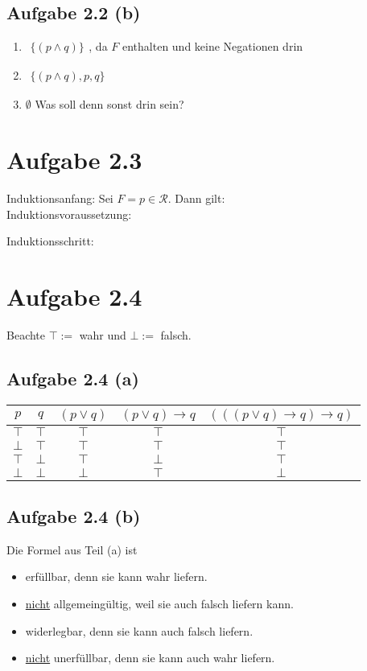 \documentclass[12pt,a4paper]{article}
\begin{document}
\subsection*{Aufgabe 2.2 (b)}
\begin{enumerate}[label=(\arabic*)]
\item $\begin{aligned}\big\lbrace
(p\wedge q)
\big\rbrace\end{aligned}$, da $F$ enthalten und keine Negationen drin
\item $\begin{aligned}\big\lbrace
(p\wedge q), p, q
\big\rbrace\end{aligned}$
\item $\emptyset$ Was soll denn sonst drin sein?
\end{enumerate}

\section*{Aufgabe 2.3}
Induktionsanfang: Sei $F=p\in\mathcal{R}$. Dann gilt:\\

Induktionsvoraussetzung:

Induktionsschritt:

\section*{Aufgabe 2.4}
Beachte $\top:=$ wahr und $\bot:=$ falsch.
\subsection*{Aufgabe 2.4 (a)}
\begin{tabular}{c|c||c|c|c}
$p$ & $q$ & $(p\vee q)$ & $(p\vee q)\to q$ & $(((p\vee q)\to q)\to q)$\\ \hline
$\top$ & $\top$ & $\top$ & $\top$ & $\top$\\
$\bot$ & $\top$ & $\top$ & $\top$ & $\top$\\
$\top$ & $\bot$ & $\top$ & $\bot$ & $\top$\\
$\bot$ & $\bot$ & $\bot$ & $\top$ & $\bot$
\end{tabular}

\subsection*{Aufgabe 2.4 (b)}
Die Formel aus Teil (a) ist
\begin{itemize}
\item erfüllbar, denn sie kann wahr liefern.
\item \underline{nicht} allgemeingültig, weil sie auch falsch liefern kann.
\item widerlegbar, denn sie kann auch falsch liefern.
\item \underline{nicht} unerfüllbar, denn sie kann auch wahr liefern.
\end{itemize}
\end{document}
